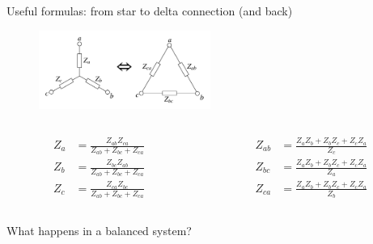 \begin{frame}{Useful formulas: from star to delta connection (and back)}
    \begin{figure}
        \centering
        \includegraphics[width=0.5\textwidth]{images/star_delta.png}
    \end{figure}
    \begin{columns}
        \begin{column}{0.5\textwidth}
            $$ \begin{aligned}
            Z_a &= \frac{Z_{ab}Z_{ca}}{Z_{ab} + Z_{bc} + Z_{ca}} \\
            Z_b &= \frac{Z_{bc}Z_{ab}}{Z_{ab} + Z_{bc} + Z_{ca}} \\
            Z_c &= \frac{Z_{ca}Z_{bc}}{Z_{ab} + Z_{bc} + Z_{ca}}
            \end{aligned}$$
        \end{column}
        \begin{column}{0.5\textwidth}
            $$ \begin{aligned}
            Z_{ab} &= \frac{Z_{a}Z_{b}+Z_{b}Z_{c}+Z_{c}Z_{a}}{Z_{c}} \\
            Z_{bc} &= \frac{Z_{a}Z_{b}+Z_{b}Z_{c}+Z_{c}Z_{a}}{Z_{a}} \\
            Z_{ca} &= \frac{Z_{a}Z_{b}+Z_{b}Z_{c}+Z_{c}Z_{a}}{Z_{b}}
            \end{aligned}$$
        \end{column}
    \end{columns}
    What happens in a balanced system?
\end{frame}

